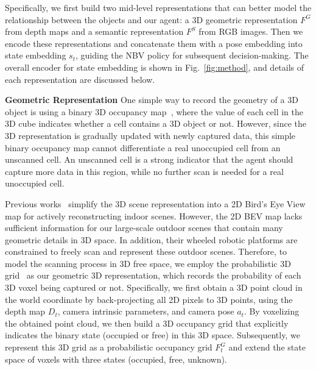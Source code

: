     Specifically, we first build two mid-level representations that can better model the relationship between the objects and our agent: a 3D geometric representation $F^G$ from depth maps and a semantic representation $F^S$ from RGB images. Then we encode these representations and concatenate them with a pose embedding into state embedding $s_t$, guiding the NBV policy for subsequent decision-making. The overall encoder for state embedding is shown in Fig.~\ref{fig:method}, and details of each representation are discussed below.

    \vspace{1pt}
    \noindent\textbf{Geometric Representation}\quad  
    One simple way to record the geometry of a 3D object is using a binary 3D occupancy map~\citep{chaplotlearning}, where the value of each cell in the 3D cube indicates whether a cell contains a 3D object or not. However, since the 3D representation is gradually updated with newly captured data, this simple binary occupancy map cannot differentiate a real unoccupied cell from an unscanned cell. An unscanned cell is a strong indicator that the agent should capture more data in this region, while no further scan is needed for a real unoccupied cell.
    
    Previous works~\citep{chaplotlearning, ye2022multi, guo2022asynchronous} simplify the 3D scene representation into a 2D Bird's Eye View map for actively reconstructing indoor scenes. However, the 2D BEV map lacks sufficient information for our large-scale outdoor scenes that contain many geometric details in 3D space. In addition, their wheeled robotic platforms are constrained to freely scan and represent these outdoor scenes.
    Therefore, to model the scanning process in 3D free space, we employ the probabilistic 3D grid~\citep{thrun2002probabilistic} as our geometric 3D representation, which records the probability of each 3D voxel being captured or not. Specifically, we first obtain a 3D point cloud in the world coordinate by back-projecting all 2D pixels to 3D points, using the depth map $D_t$, camera intrinsic parameters, and camera pose $a_t$. By voxelizing the obtained point cloud, we then build a 3D occupancy grid that explicitly indicates the binary state (occupied or free) in this 3D space. 
    Subsequently, we represent this 3D grid as a probabilistic occupancy grid $F^G_t$ and extend the state space of voxels with three states (occupied, free, unknown).

